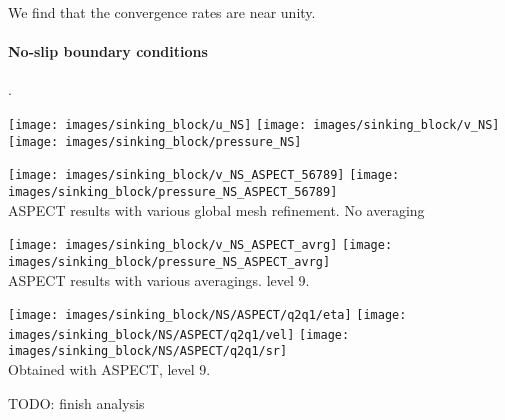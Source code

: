 We find that the convergence rates are near unity.






\newpage
\paragraph{No-slip boundary conditions}.

\begin{center}
\texttt{[image: images/sinking\_block/u\_NS]}
\texttt{[image: images/sinking\_block/v\_NS]}
\texttt{[image: images/sinking\_block/pressure\_NS]}
\end{center}

\begin{center}
\texttt{[image: images/sinking\_block/v\_NS\_ASPECT\_56789]}
\texttt{[image: images/sinking\_block/pressure\_NS\_ASPECT\_56789]}\\
{\captionfont ASPECT results with various global mesh refinement. No averaging}
\end{center}

\begin{center}
\texttt{[image: images/sinking\_block/v\_NS\_ASPECT\_avrg]}
\texttt{[image: images/sinking\_block/pressure\_NS\_ASPECT\_avrg]}\\
{\captionfont ASPECT results with various averagings. level 9.}
\end{center}


\begin{center}
\texttt{[image: images/sinking\_block/NS/ASPECT/q2q1/eta]}
\texttt{[image: images/sinking\_block/NS/ASPECT/q2q1/vel]}
\texttt{[image: images/sinking\_block/NS/ASPECT/q2q1/sr]}\\
{\captionfont Obtained with ASPECT, level 9.}
\end{center}

TODO: finish analysis








